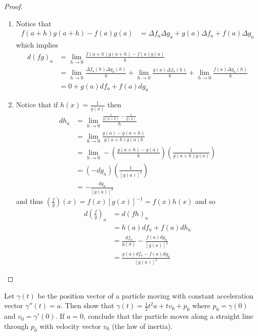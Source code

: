 \begin{proof}
\begin{enumerate}
    \item Notice that 
    \begin{align*}
    f(a+h)g(a+h)-f(a)g(a) &=  \Delta f_a \Delta g_a + g(a)\Delta f_a + f(a)\Delta g_a
    \end{align*}
    which implies
    \begin{align*}
    d(fg)_a &= \lim_{h \rightarrow 0} \frac{f(a+h)g(a+h)-f(a)g(a)}{h} \\
    &= \lim_{h \rightarrow 0}\frac{\Delta f_a(h) \Delta g_a(h)}{h} + \lim_{h \rightarrow 0} \frac{g(a)\Delta f_a(h)}{h} + \lim_{h \rightarrow 0} \frac{f(a) \Delta g_a(h)}{h} \\
    &= 0 + g(a)df_a + f(a)dg_a
    \end{align*}
    
    \item Notice that if \( h(x) = \frac{1}{g(x)} \) then
    \begin{align*}
        dh_a &= \lim_{h \rightarrow 0} \frac{\frac{1}{g(a+h)}-\frac{1}{g(a)}}{h}\\
        &= \lim_{h \rightarrow 0} \frac{g(a)-g(a+h)}{g(a+h)g(a)h} \\
        &= \lim_{h \rightarrow 0} -\left( \frac{g(a+h)-g(a)}{h} \right)\left( \frac{1}{g(a+h)g(a)} \right) \\
        &= (-dg_a) \left( \frac{1}{[g(a)]^2} \right) \\
        &= -\frac{dg_a}{[g(a)]^2}
    \end{align*}
    and thus \( \left( \frac{f}{g} \right)(x) = f(x)[g(x)]^{-1} = f(x)h(x) \) and so
    \begin{align*}
        d\left( \frac{f}{g} \right)_a &= d(fh)_a \\
        &= h(a)df_a+f(a)dh_a \\
        &= \frac{df_a}{g(a)}-\frac{f(a)dg_a}{[g(a)]^2} \\
        &= \frac{g(a)df_a-f(a)dg_a}{[g(a)]^2}
    \end{align*}
\end{enumerate}
\end{proof}

\question Let \( \gamma(t) \) be the position vector of a particle moving with constant acceleration vector \( \gamma''(t)=a \). Then show that \( \gamma(t) = \frac{1}{2}t^2a+tv_0+p_0 \) where \( p_0=\gamma(0) \) and \( v_0 = \gamma'(0) \). If \( a = 0 \), conclude that the particle moves along a straight line through \( p_0 \) with velocity vector \( v_0 \) (the law of inertia).  

